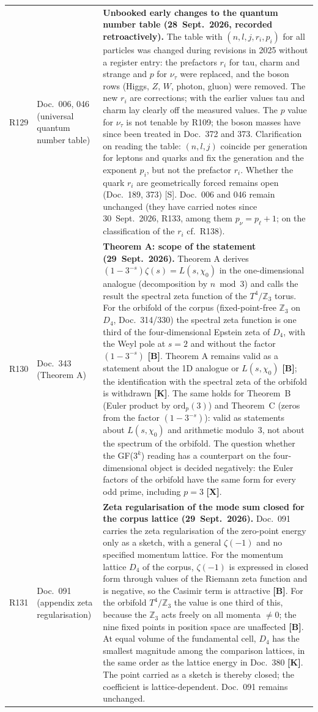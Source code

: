 \begin{longtable}{@{}p{0.9cm}p{3.1cm}p{10.2cm}@{}}
R129 & Doc.~006, 046 (universal quantum number table) & \textbf{Unbooked early changes to the quantum number table (28~Sept.~2026, recorded retroactively).} The table with $(n,l,j,r_i,p_i)$ for all particles was changed during revisions in 2025 without a register entry: the prefactors $r_i$ for tau, charm and strange and $p$ for $\nu_\tau$ were replaced, and the boson rows (Higgs, $Z$, $W$, photon, gluon) were removed. The new $r_i$ are corrections; with the earlier values tau and charm lay clearly off the measured values. The $p$ value for $\nu_\tau$ is not tenable by R109; the boson masses have since been treated in Doc.~372 and 373. Clarification on reading the table: $(n,l,j)$ coincide per generation for leptons and quarks and fix the generation and the exponent $p_i$, but not the prefactor $r_i$. Whether the quark $r_i$ are geometrically forced remains open (Doc.~189, 373) [S]. Doc.~006 and 046 remain unchanged (they have carried notes since 30~Sept.~2026, R133, among them $p_\nu=p_\ell+1$; on the classification of the $r_i$ cf.\ R138). \\
R130 & Doc.~343 (Theorem A) & \textbf{Theorem A: scope of the statement (29~Sept.~2026).} Theorem A derives $(1-3^{-s})\zeta(s)=L(s,\chi_0)$ in the one-dimensional analogue (decomposition by $n \bmod 3$) and calls the result the spectral zeta function of the $T^4/\mathbb{Z}_3$ torus. For the orbifold of the corpus (fixed-point-free $\mathbb{Z}_3$ on $D_4$, Doc.~314/330) the spectral zeta function is one third of the four-dimensional Epstein zeta of $D_4$, with the Weyl pole at $s=2$ and without the factor $(1-3^{-s})$ \textbf{[B]}. Theorem A remains valid as a statement about the 1D analogue or $L(s,\chi_0)$ \textbf{[B]}; the identification with the spectral zeta of the orbifold is withdrawn \textbf{[K]}. The same holds for Theorem~B (Euler product by $\mathrm{ord}_p(3)$) and Theorem~C (zeros from the factor $(1-3^{-s})$): valid as statements about $L(s,\chi_0)$ and arithmetic modulo~3, not about the spectrum of the orbifold. The question whether the GF($3^k$) reading has a counterpart on the four-dimensional object is decided negatively: the Euler factors of the orbifold have the same form for every odd prime, including $p=3$ \textbf{[X]}. \\
R131 & Doc.~091 (appendix zeta regularisation) & \textbf{Zeta regularisation of the mode sum closed for the corpus lattice (29~Sept.~2026).} Doc.~091 carries the zeta regularisation of the zero-point energy only as a sketch, with a general $\zeta(-1)$ and no specified momentum lattice. For the momentum lattice $D_4$ of the corpus, $\zeta(-1)$ is expressed in closed form through values of the Riemann zeta function and is negative, so the Casimir term is attractive \textbf{[B]}. For the orbifold $T^4/\mathbb{Z}_3$ the value is one third of this, because the $\mathbb{Z}_3$ acts freely on all momenta $\neq0$; the nine fixed points in position space are unaffected \textbf{[B]}. At equal volume of the fundamental cell, $D_4$ has the smallest magnitude among the comparison lattices, in the same order as the lattice energy in Doc.~380 \textbf{[K]}. The point carried as a sketch is thereby closed; the coefficient is lattice-dependent. Doc.~091 remains unchanged. \\

\end{longtable}
